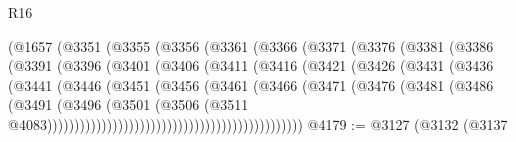 \begin{lexlean}{R16}
\begin{coremodule}
                            (@1657
                              (@3351
                                (@3355
                                  (@3356
                                    (@3361
                                      (@3366
                                        (@3371
                                          (@3376
                                            (@3381
                                              (@3386
                                                (@3391
                                                  (@3396
                                                    (@3401
                                                      (@3406
                                                        (@3411
                                                          (@3416
                                                            (@3421
                                                              (@3426
                                                                (@3431
                                                                  (@3436
                                                                    (@3441
                                                                      (@3446
                                                                        (@3451
                                                                          (@3456
                                                                            (@3461
                                                                              (@3466
                                                                                (@3471
                                                                                  (@3476
                                                                                    (@3481
                                                                                      (@3486
                                                                                        (@3491
                                                                                          (@3496
                                                                                            (@3501
                                                                                              (@3506
                                                                                                (@3511
                                                                                                  @4083)))))))))))))))))))))))))))))))))))))))))))))))
@4179 := @3127
    (@3132
      (@3137

\end{coremodule}
\end{lexlean}

